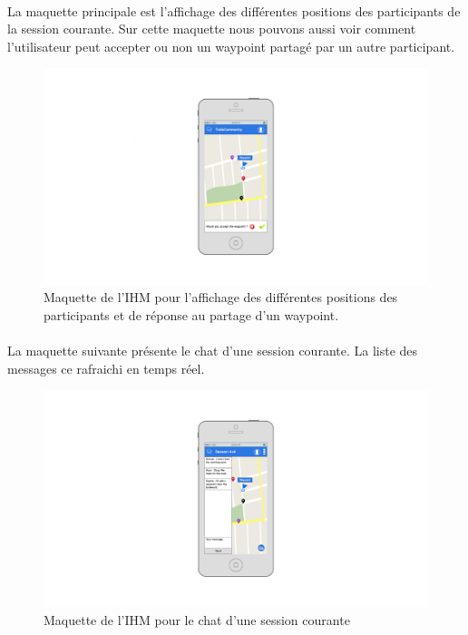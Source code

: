 \documentclass[titlepage, 12pt]{report}
\begin{document}
\clearpage

\paragraph{}La maquette principale est l'affichage des différentes positions des participants de la session courante. Sur cette maquette nous pouvons aussi voir comment l'utilisateur peut accepter ou non un waypoint partagé par un autre participant.

\begin{figure}[!h]
	\caption{Maquette de l'IHM pour l'affichage des différentes positions des participants et de réponse au partage d'un waypoint.}
	\label{session_view}
	\centering
	\includegraphics[scale=0.3]{images/mockups/session_marker.png}
\end{figure}

\clearpage

\paragraph{}La maquette suivante présente le chat d'une session courante. La liste des messages ce rafraichi en temps réel.

\begin{figure}[!h]
	\caption{Maquette de l'IHM pour le chat d'une session courante}
	\label{chat_view}
	\centering
	\includegraphics[scale=0.3]{images/mockups/chat.png}
\end{figure}
\end{document}
